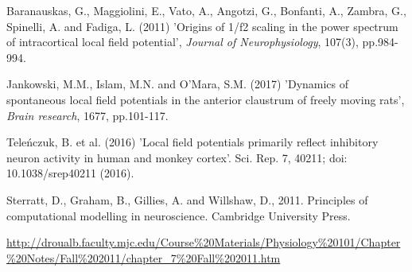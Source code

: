 \documentclass{uiophd}
\begin{document}
\begin{thebibliography}{1}
Baranauskas, G., Maggiolini, E., Vato, A., Angotzi, G., Bonfanti, A., Zambra, G., Spinelli, A. and Fadiga, L. (2011) 'Origins of 1/f2 scaling in the power spectrum of intracortical local field potential', \textit{Journal of Neurophysiology}, 107(3), pp.984-994.


Jankowski, M.M., Islam, M.N. and O'Mara, S.M. (2017) 'Dynamics of spontaneous local field potentials in the anterior claustrum of freely moving rats', \textit{Brain research}, 1677, pp.101-117.









 Teleńczuk, B. et al. (2016) 'Local field potentials primarily reflect inhibitory neuron activity in human and monkey cortex'. Sci. Rep. 7, 40211; doi: 10.1038/srep40211 (2016).















Sterratt, D., Graham, B., Gillies, A. and Willshaw, D., 2011. Principles of computational modelling in neuroscience. Cambridge University Press.

















\url{http://droualb.faculty.mjc.edu/Course%20Materials/Physiology%20101/Chapter%20Notes/Fall%202011/chapter_7%20Fall%202011.htm}



\end{thebibliography}
\end{document}
